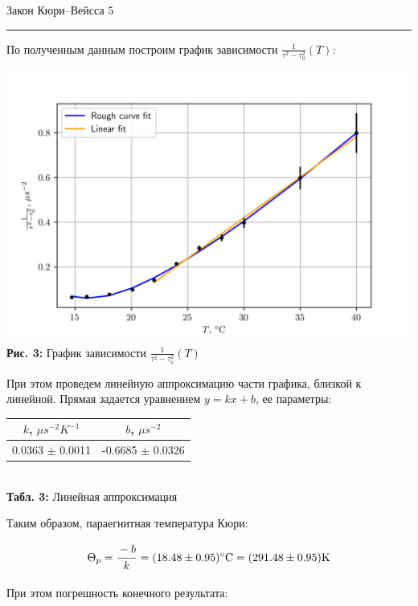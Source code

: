 \documentclass[12pt,a4paper]{scrartcl}
\begin{document}
	\begin{flushleft}
		\footnotesize{Закон Кюри–Вейсса} \hspace{\fill} \footnotesize{5}
		\\[-0.3cm]\noindent\rule{\textwidth}{0.3pt}
	\end{flushleft}
	
	По полученным данным построим график зависимости $\frac{1}{\tau^2 - \tau_0^2}(T)$:
	
	\begin{center}
		\includegraphics[scale=1]{PIC_3.png}
		\\\textbf{Рис. 3:} График зависимости $\frac{1}{\tau^2 - \tau_0^2}(T)$
	\end{center}
	
	При этом проведем линейную аппроксимацию  части графика, близкой к линейной. Прямая задается уравнением $y = kx + b$, ее параметры:
	
	\begin{center}
		\begin{tabular}{|c|c|}
			\hline
			$k$, $\mu s^{-2} K^{-1}$ & $b$, $\mu s^{-2}$
			\\\hline
			0.0363 $\pm$ 0.0011 & -0.6685 $\pm$ 0.0326
			\\\hline
		\end{tabular}
		\\\textbf{Табл. 3:} Линейная аппроксимация
	\end{center}

	Таким образом, параегнитная температура Кюри:
	
	$$\Theta_p = \dfrac{\strut -b}{\strut k} = (18.48 \pm 0.95) ^\circ \mathrm{C} = (291.48 \pm 0.95) \mathrm{K}$$
	
	При этом погрешность конечного результата:
	
\end{document}
